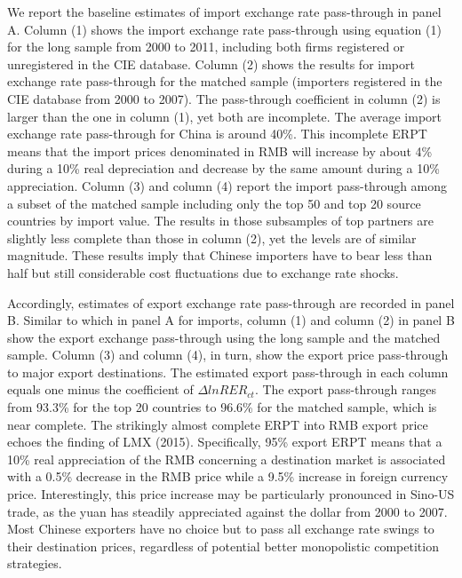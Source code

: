 We report the baseline estimates of import exchange rate pass-through in panel A. Column (1) shows the import exchange rate pass-through using equation (1) for the long sample from 2000 to 2011, including both firms registered or unregistered in the CIE database. Column (2) shows the results for import exchange rate pass-through for the matched sample (importers registered in the CIE database from 2000 to 2007). The pass-through coefficient in column (2) is larger than the one in column (1), yet both are incomplete. The average import exchange rate pass-through for China is around 40\%. This incomplete ERPT means that the import prices denominated in RMB will increase by about 4\% during a 10\% real depreciation and decrease by the same amount during a 10\% appreciation. Column (3) and column (4) report the import pass-through among a subset of the matched sample including only the top 50 and top 20 source countries by import value. The results in those subsamples of top partners are slightly less complete than those in column (2), yet the levels are of similar magnitude. These results imply that Chinese importers have to bear less than half but still considerable cost fluctuations due to exchange rate shocks.

Accordingly, estimates of export exchange rate pass-through are recorded in panel B. Similar to which in panel A for imports, column (1) and column (2) in panel B show the export exchange pass-through using the long sample and the matched sample. Column (3) and column (4), in turn, show the export price pass-through to major export destinations. The estimated export pass-through in each column equals one minus the coefficient of $\Delta lnRER_{ct}$. The export pass-through ranges from 93.3\% for the top 20 countries to 96.6\% for the matched sample, which is near complete. The strikingly almost complete ERPT into RMB export price echoes the finding of LMX (2015)\cite{lmx2015}. Specifically, 95\% export ERPT means that a 10\% real appreciation of the RMB concerning a destination market is associated with a 0.5\% decrease in the RMB price while a 9.5\% increase in foreign currency price. Interestingly, this price increase may be particularly pronounced in Sino-US trade, as the yuan has steadily appreciated against the dollar from 2000 to 2007. Most Chinese exporters have no choice but to pass all exchange rate swings to their destination prices, regardless of potential better monopolistic competition strategies.

